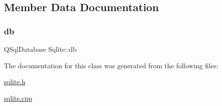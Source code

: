 \subsection{Member Data Documentation}
\mbox{\label{class_sqlite_afaaed0591ef0d92547dc5f049a22b3a6}} 
\subsubsection{\texorpdfstring{db}{db}}
{\footnotesize\ttfamily Q\+Sql\+Database Sqlite\+::db\hspace{0.3cm}{\ttfamily [private]}}



The documentation for this class was generated from the following files\+:\begin{DoxyCompactItemize}
\item 
\mbox{\hyperlink{sqlite_8h}{sqlite.\+h}}\item 
\mbox{\hyperlink{sqlite_8cpp}{sqlite.\+cpp}}\end{DoxyCompactItemize}
